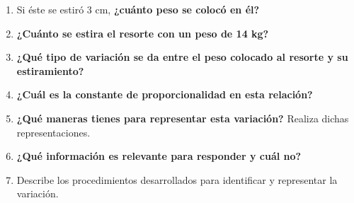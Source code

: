\documentclass[11pt]{book}
\begin{document}
\begin{enumerate}
\begin{minipage}[t]{0.15\linewidth}
\begin{figure}[H]
            \label{fig:dinamometro}
          \end{figure}%
        \end{minipage}%
        \begin{minipage}[t]{0.85\linewidth}
          \begin{enumerate}
            \item Si éste se estiró 3 cm, \textbf{¿cuánto peso se colocó en él?}\\[0.5cm]
            \item \textbf{¿Cuánto se estira el resorte con un peso de 14 kg?}\\[0.5cm]
            \item \textbf{¿Qué tipo de variación se da entre el peso colocado al resorte y su estiramiento?}\\[0.5cm]
            \item \textbf{¿Cuál es la constante de proporcionalidad en esta relación?}\\[0.5cm]
            \item \textbf{¿Qué maneras tienes para representar esta variación?} Realiza dichas representaciones.\\[0.5cm]
            \item \textbf{¿Qué información es relevante para responder y cuál no?}\\[0.5cm]
            \item Describe los procedimientos desarrollados para identificar y representar la variación.
          \end{enumerate}

        \end{minipage}
        \newpage


\end{enumerate}
\end{document}
